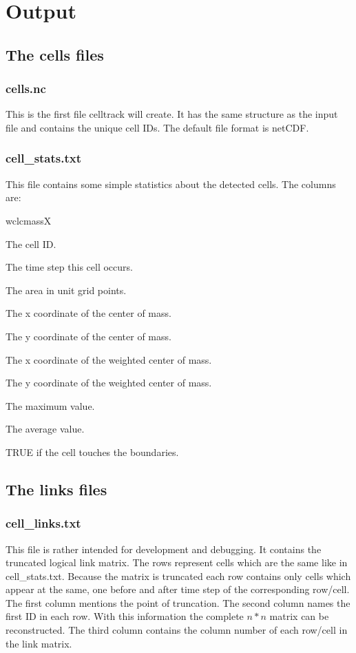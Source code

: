 \documentclass{scrartcl}
\begin{document}
\section{Output}
\label{sec:output}

\subsection{The cells files}
\subsubsection{cells.nc}
This is the first file celltrack will create. It has the same structure as the input file and contains the unique cell IDs. The default file format is netCDF.

\subsubsection{cell\_stats.txt}
This file contains some simple statistics about the detected cells. The columns are:
\begin{labeling}{wclcmassX}
	\item[clID] The cell ID.
	\item[tsclID] The time step this cell occurs.
	\item[clarea] The area in unit grid points.
	\item[clcmassX] The x coordinate of the center of mass.
	\item[clcmassY] The y coordinate of the center of mass.
	\item[wclcmassX] The x coordinate of the weighted center of mass.
	\item[wclcmassY] The y coordinate of the weighted center of mass.
	\item[peakVal] The maximum value.
	\item[avVal] The average value.
	\item[bound] TRUE if the cell touches the boundaries.
\end{labeling}

\subsection{The links files}
\subsubsection{cell\_links.txt}
This file is rather intended for development and debugging. It contains the truncated logical link matrix. The rows represent cells which are the same like in cell\_stats.txt. Because the matrix is truncated each row contains only cells which appear at the same, one before and after time step of the corresponding row/cell. The first column mentions the point of truncation. The second column names the first ID in each row. With this information the complete $n*n$ matrix can be reconstructed. The third column contains the column number of each row/cell in the link matrix.
\end{document}
